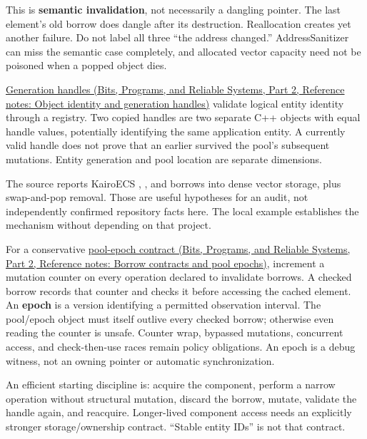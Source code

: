 This is \textbf{semantic invalidation}, not necessarily a dangling pointer. The last element's old borrow does dangle after its destruction. Reallocation creates yet another failure. Do not label all three ``the address changed.'' AddressSanitizer can miss the semantic case completely, and allocated vector capacity need not be poisoned when a popped object dies.

\href{../01-Bits-Programs-and-Reliable-Systems-P02/main.pdf\#nameddest=appendix-f1581457d322}{Generation handles (Bits, Programs, and Reliable Systems, Part 2, Reference notes: Object identity and generation handles)} validate logical entity identity through a registry. Two copied handles are two separate C++ objects with equal handle values, potentially identifying the same application entity. A currently valid handle does not prove that an earlier  survived the pool's subsequent mutations. Entity generation and pool location are separate dimensions.

The source reports KairoECS , , and  borrows into dense vector storage, plus swap-and-pop removal. Those are useful hypotheses for an audit, not independently confirmed repository facts here. The local  example establishes the mechanism without depending on that project.

For a conservative \href{../01-Bits-Programs-and-Reliable-Systems-P02/main.pdf\#nameddest=appendix-aa405b7c3903}{pool-epoch contract (Bits, Programs, and Reliable Systems, Part 2, Reference notes: Borrow contracts and pool epochs)}, increment a mutation counter on every operation declared to invalidate borrows. A checked borrow records that counter and checks it before accessing the cached element. An \textbf{epoch} is a version identifying a permitted observation interval. The pool/epoch object must itself outlive every checked borrow; otherwise even reading the counter is unsafe. Counter wrap, bypassed mutations, concurrent access, and check-then-use races remain policy obligations. An epoch is a debug witness, not an owning pointer or automatic synchronization.

An efficient starting discipline is: acquire the component, perform a narrow operation without structural mutation, discard the borrow, mutate, validate the handle again, and reacquire. Longer-lived component access needs an explicitly stronger storage/ownership contract. ``Stable entity IDs'' is not that contract.

